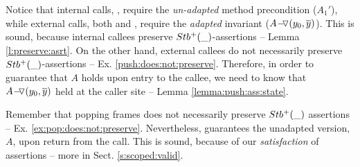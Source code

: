 Notice that   internal calls, {},   require   the \emph{un-adapted} %
 method  precondition (\ie $A_1'$), while   external calls, both {} and {},  require the 
 \emph{adapted} %
 invariant (\ie $ \PushASLong {(y_0, \overline y)}{A}$). 
{This is sound, because  internal callees preserve  %
 $\Pos{\_}$-assertions} %
 -- \cf Lemma \ref{l:preserve:asrt}. 
On the other hand, %
 {external callees do not necessarily preserve  $\Pos{\_}$-assertions} -- \cf Ex. \ref{push:does:not:preserve}. 
Therefore, in order to guarantee that $A$ holds upon entry to the callee, we need to know that $ \PushASLong {(y_0, \overline y)}{A}$ held at the caller site -- \cf Lemma \ref{lemma:push:ass:state}.



Remember that {popping frames does not necessarily preserve}
 $\Pos{\_}$  assertions %
-- \cf Ex. \ref{ex:pop:does:not:preserve}.
Nevertheless, {} guarantees the unadapted version, $A$,  upon return from the call. 
This is sound, because of our %
 \emph{\strong satisfaction} of assertions -- more in Sect.  \ref{s:scoped:valid}.
 


